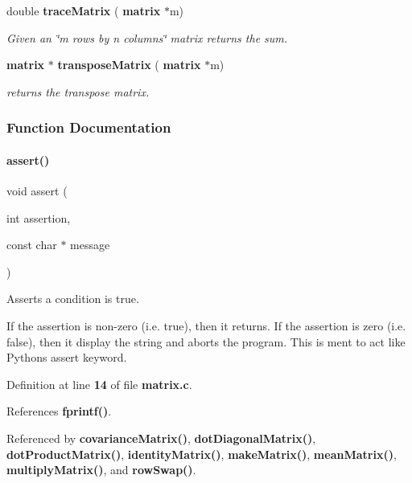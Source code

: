 \begin{DoxyCompactItemize}
double \textbf{ trace\+Matrix} (\textbf{ matrix} $\ast$m)
\begin{DoxyCompactList}\small\item\em Given an \char`\"{}m rows by n columns\char`\"{} matrix returns the sum. \end{DoxyCompactList}\item 
\textbf{ matrix} $\ast$ \textbf{ transpose\+Matrix} (\textbf{ matrix} $\ast$m)
\begin{DoxyCompactList}\small\item\em returns the transpose matrix. \end{DoxyCompactList}\end{DoxyCompactItemize}


\subsubsection{Function Documentation}
\mbox{\label{matrix_8c_a8e41e30382335ea89f90b72db0b44d6f}} 
\paragraph{assert()}
{\footnotesize\ttfamily void assert (\begin{DoxyParamCaption}\item[{int}]{assertion,  }\item[{const char $\ast$}]{message }\end{DoxyParamCaption})}



Asserts a condition is true. 

If the assertion is non-\/zero (i.\+e. true), then it returns. If the assertion is zero (i.\+e. false), then it display the string and aborts the program. This is ment to act like Python\textquotesingle{}s assert keyword. 

Definition at line \textbf{ 14} of file \textbf{ matrix.\+c}.



References \textbf{ fprintf()}.



Referenced by \textbf{ covariance\+Matrix()}, \textbf{ dot\+Diagonal\+Matrix()}, \textbf{ dot\+Product\+Matrix()}, \textbf{ identity\+Matrix()}, \textbf{ make\+Matrix()}, \textbf{ mean\+Matrix()}, \textbf{ multiply\+Matrix()}, and \textbf{ row\+Swap()}.


